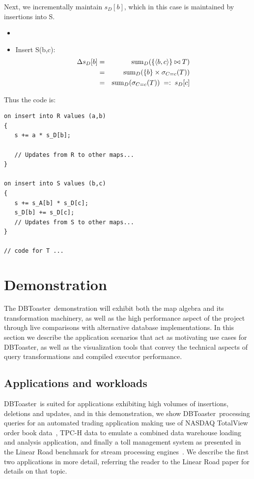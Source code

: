\documentclass{vldb}
\newcommand{\tuple}[1]{{\langle#1\rangle}}
\newcommand{\compiler}{DBToaster}
\begin{document}
 
Next, we incrementally maintain $s_D[b]$, which in this case is maintained by
insertions into S.

\begin{itemize}
\item
\item
Insert S(b,c):
\begin{eqnarray*}
\Delta s_D[b] &=&
\algsum_{D}(\{\tuple{b,c}\} \bowtie T)
\\ &=&
\algsum_{D}(\{b\} \times \sigma_{C=c}(T))
\\ &=&
\algsum_{D}(\sigma_{C=c}(T))
\;=:\; s_D[c]
\end{eqnarray*}
\end{itemize}

Thus the code is:
\begin{verbatim}
on insert into R values (a,b)
{
   s += a * s_D[b];

   // Updates from R to other maps...
}

on insert into S values (b,c)
{
   s += s_A[b] * s_D[c];
   s_D[b] += s_D[c];
   // Updates from S to other maps...
}

// code for T ...
\end{verbatim}



\section{Demonstration}
The \compiler\ demonstration will exhibit both the map algebra and its
transformation machinery, as well as the high performance aspect of the
project through live comparisons with alternative database implementations.
In this section we describe the application scenarios that act as motivating
use cases for \compiler, as well as the visualization tools that convey the
technical aspects of query transformations and compiled executor performance.

\subsection{Applications and workloads}
\compiler\ is suited for applications exhibiting high volumes of insertions,
deletions and updates, and in this demonstration, we show \compiler\ processing
queries for an automated trading application making use of NASDAQ TotalView order
book data~\cite{totalview-url}, TPC-H data to emulate a combined data warehouse
loading and analysis application, and finally a toll management system as
presented in the Linear Road benchmark for stream processing
engines~\cite{arasu-vldb:04}. We describe the first two applications in more
detail, referring the reader to the Linear Road paper for details on that topic.
\end{document}

